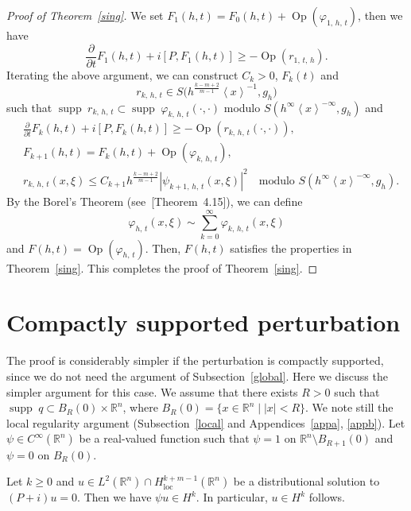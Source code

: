 \documentclass[AHL,Unicode,longabstracts,published]{cedram}
\newcommand*\f{\varphi}
\newcommand*\g{\psi}
\newcommand*\x{\xi}
\DeclareMathOperator{\Op}{Op}
\newcommand*\re{\mathbb{R}}
\newcommand*\pa{\partial}
\DeclareMathOperator{\supp}{supp\;}
\DeclareMathOperator{\loc}{loc}
\newcommand{\jap}[1]{\left\langle #1 \right\rangle}
\newcommand{\bigpare}[1]{\bigl(#1\bigr)}
\begin{document}
\begin{proof}[Proof of Theorem~\ref{sing}]
We set $F_1(h,t) = F_0(h,t) +\Op(\f_{1,\,h,\,t})$, then we have
\[
\frac{\pa}{\pa t} F_1(h,t) + i[P,F_1(h,t)] \geq - \Op(r_{1,\,t,\,h}).
\]
Iterating the above argument, we can construct $C_k>0$, $F_k(t)$ and
\[
r_{k,\,h,\,t} \in S\bigpare{h^{\frac{k-m+2}{m-1}}\jap{x}^{-1},g_h}
\]
such that $\supp r_{k,\,h,\,t}\subset \supp \f_{k,\,h,\,t}(\cdot,\cdot)$ modulo $S(h^{\infty}\jap{x}^{-\infty},g_h)$ and
\begin{align*}
&\frac{\pa}{\pa t} F_k(h,t) + i[P,F_k(h,t)] \geq -\Op(r_{k,\,h,\,t}(\cdot,\cdot)),\\
&F_{k+1}(h,t) = F_{k}(h,t) + \Op(\f_{k,\,h,\,t}),\\
&r_{k,\,h,\,t}(x,\x) \leq C_{k+1}h^{\frac{k-m+2}{m-1}} |\g_{k+1,\,h,\,t}(x,\x)|^2\quad\text{modulo } S(h^{\infty}\jap{x}^{-\infty},g_h).
\end{align*}
By the Borel's Theorem (see~[Theorem~4.15]\cite{Z}), we can define
\[
\f_{h,\,t}(x,\x) \sim \sum_{k=0}^{\infty} \f_{k,\,h,\,t}(x,\x)
\]
and $F(h,t) = \Op(\f_{h,\,t})$. Then, $F(h,t)$ satisfies the properties in Theorem~\ref{sing}. This completes the proof of Theorem~\ref{sing}.
\end{proof}


\section{Compactly supported perturbation}\label{appcpt}

The proof is considerably simpler if the perturbation is compactly supported, since we do not need the argument of Subsection~\ref{global}. Here we discuss the simpler argument for this case. We assume that there exists $R>0$ such that $\supp q\subset B_R(0)\times \re^n$, where $B_R(0)=\{x\in \re^n\mid |x|<R\}$. We note still the local regularity argument (Subsection~\ref{local} and Appendices~\ref{appa}, \ref{appb}). Let $\g\in C^{\infty}(\re^n)$ be a real-valued function such that $\g=1$ on $\re^n\setminus B_{R+1}(0)$ and $\g=0$ on $B_R(0)$.

\begin{prop}\label{cptsupp}
Let $k\geq 0$ and $u\in L^2(\re^n) \cap H^{k+m-1}_{\loc}(\re^n)$ be a distributional solution to $(P +i) u = 0$. Then we have $\g u \in H^k$. In particular, $u\in H^k$ follows.
\end{prop}
\end{document}
